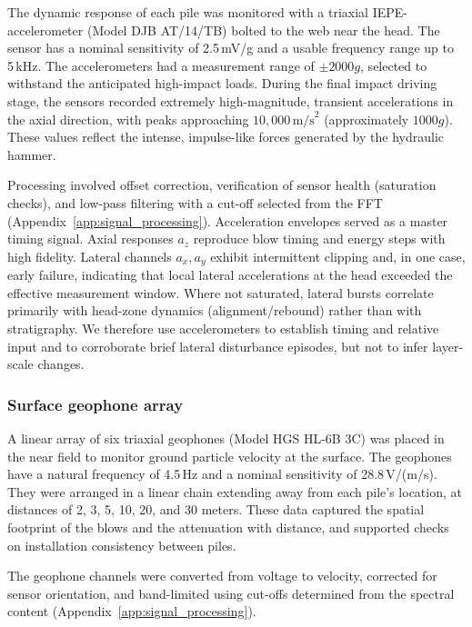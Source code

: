 {{{{The dynamic response of each pile was monitored with a triaxial IEPE-accelerometer (Model DJB AT/14/TB) bolted to the web near the head. The sensor has a nominal sensitivity of 2.5\,mV/g and a usable frequency range up to 5\,kHz. The accelerometers had a measurement range of $\pm2000g$, selected to withstand the anticipated high-impact loads. During the final impact driving stage, the sensors recorded extremely high-magnitude, transient accelerations in the axial direction, with peaks approaching $10,000\,\text{m/s}^2$ (approximately $1000g$). These values reflect the intense, impulse-like forces generated by the hydraulic hammer.

Processing involved offset correction, verification of sensor health (saturation checks), and low-pass filtering with a cut-off selected from the FFT (Appendix~\ref{app:signal_processing}). Acceleration envelopes served as a master timing signal.
Axial responses $a_z$ reproduce blow timing and energy steps with high fidelity. Lateral channels $a_x,a_y$ exhibit intermittent clipping and, in one case, early failure, indicating that local lateral accelerations at the head exceeded the effective measurement window. Where not saturated, lateral bursts correlate primarily with head-zone dynamics (alignment/rebound) rather than with stratigraphy. We therefore use accelerometers to establish timing and relative input and to corroborate brief lateral disturbance episodes, but not to infer layer-scale changes.

\subsubsection{Surface geophone array}
\label{sec:geophones}

A linear array of six triaxial geophones (Model HGS HL-6B 3C) was placed in the near field to monitor ground particle velocity at the surface. The geophones have a natural frequency of 4.5\,Hz and a nominal sensitivity of 28.8\,V/(m/s). They were arranged in a linear chain extending away from each pile's location, at distances of 2, 3, 5, 10, 20, and 30 meters. These data captured the spatial footprint of the blows and the attenuation with distance, and supported checks on installation consistency between piles.

The geophone channels were converted from voltage to velocity, corrected for sensor orientation, and band-limited using cut-offs determined from the spectral content (Appendix~\ref{app:signal_processing}).

}}}}
